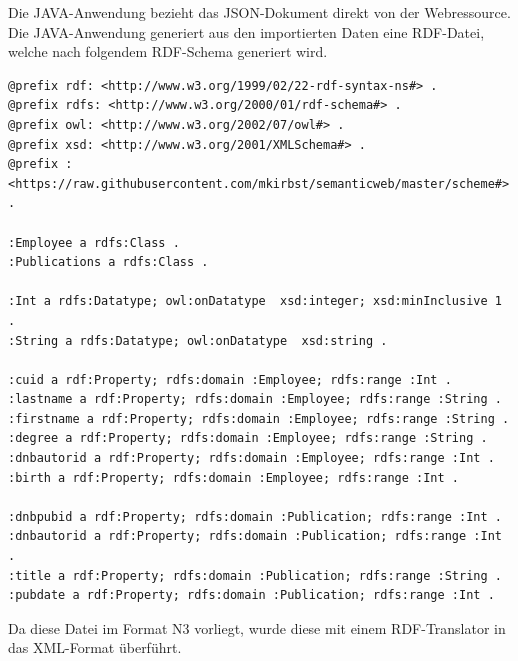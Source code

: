 \documentclass[parskip]{scrartcl}
\begin{document}
Die JAVA-Anwendung bezieht das JSON-Dokument direkt von der Webressource. Die JAVA-Anwendung generiert aus den importierten Daten eine RDF-Datei, welche nach folgendem RDF-Schema generiert wird.
\begin{lstlisting}[captionpos=b, caption=RDF-Schema der exportierten HTWK-Mitarbeiterdaten, label=RDF-Schema der exportierten HTWK-Mitarbeiterdaten]
@prefix rdf: <http://www.w3.org/1999/02/22-rdf-syntax-ns#> .
@prefix rdfs: <http://www.w3.org/2000/01/rdf-schema#> .
@prefix owl: <http://www.w3.org/2002/07/owl#> .
@prefix xsd: <http://www.w3.org/2001/XMLSchema#> .
@prefix : <https://raw.githubusercontent.com/mkirbst/semanticweb/master/scheme#> .
 
:Employee a rdfs:Class .
:Publications a rdfs:Class .

:Int a rdfs:Datatype; owl:onDatatype  xsd:integer; xsd:minInclusive 1 .
:String a rdfs:Datatype; owl:onDatatype  xsd:string .
 
:cuid a rdf:Property; rdfs:domain :Employee; rdfs:range :Int .
:lastname a rdf:Property; rdfs:domain :Employee; rdfs:range :String .
:firstname a rdf:Property; rdfs:domain :Employee; rdfs:range :String .
:degree a rdf:Property; rdfs:domain :Employee; rdfs:range :String .
:dnbautorid a rdf:Property; rdfs:domain :Employee; rdfs:range :Int .
:birth a rdf:Property; rdfs:domain :Employee; rdfs:range :Int .
 
:dnbpubid a rdf:Property; rdfs:domain :Publication; rdfs:range :Int .
:dnbautorid a rdf:Property; rdfs:domain :Publication; rdfs:range :Int .
:title a rdf:Property; rdfs:domain :Publication; rdfs:range :String .
:pubdate a rdf:Property; rdfs:domain :Publication; rdfs:range :Int .
\end{lstlisting}

Da diese Datei im Format N3 vorliegt, wurde diese mit einem RDF-Translator \cite{rdftransformator} in das XML-Format überführt.
\end{document}
